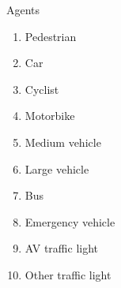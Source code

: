\documentclass[10pt, aspectratio=169]{beamer}
\begin{document}
\begin{frame}{Agents}
  \begin{multicols}{2}
        \begin{enumerate}
            \setlength\itemsep{1em}
            \item Pedestrian
            \item Car
            \item Cyclist
            \item Motorbike
            \item Medium vehicle
            \item Large vehicle
            \item Bus
            \item Emergency vehicle
            \item AV traffic light 
            \item Other traffic light
        \end{enumerate}
    \end{multicols}
\end{frame}
\end{document}
